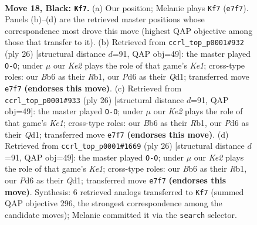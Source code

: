 \documentclass[11pt]{article}
\begin{document}
\clearpage

\begin{figure}[p]\centering
\begin{subfigure}{0.46\textwidth}\centering
\resizebox{\linewidth}{!}{%
\newchessgame
\chessboard[
  setfen={rq6/1bp1k1pp/1b1p1n2/1p2n3/pP2P3/N1P5/P1Q2PPP/1RB1RK2 b - - 3 18},
  showmover=false,
  pgfstyle=straightmove, color=movearrow, markmove={e7-f7}
]}
\caption{}
\end{subfigure}\hfill
\begin{subfigure}{0.46\textwidth}\centering
\resizebox{\linewidth}{!}{%
\newchessgame
\chessboard[
  setfen={r1b2rk1/pp2qppp/2n5/3p4/3P1B2/b2BP3/P2N1PPP/1R1QK2R w K - 1 14},
  showmover=false,
  pgfstyle=straightmove, color=movearrow, markmove={e1-g1}
]}
\caption{}
\end{subfigure}
\\[4pt]
\begin{subfigure}{0.46\textwidth}\centering
\resizebox{\linewidth}{!}{%
\newchessgame
\chessboard[
  setfen={r1b2rk1/pp2qppp/2n5/3p4/3P1B2/b2BP3/P2N1PPP/1R1QK2R w K - 1 14},
  showmover=false,
  pgfstyle=straightmove, color=movearrow, markmove={e1-g1}
]}
\caption{}
\end{subfigure}\hfill
\begin{subfigure}{0.46\textwidth}\centering
\resizebox{\linewidth}{!}{%
\newchessgame
\chessboard[
  setfen={r1b2rk1/pp2qppp/2n5/3p4/3P1B2/b2BP3/P2N1PPP/1R1QK2R w K - 1 14},
  showmover=false,
  pgfstyle=straightmove, color=movearrow, markmove={e1-g1}
]}
\caption{}
\end{subfigure}
\caption{\textbf{Move 18, Black: \texttt{Kf7}.} (a) Our position; Melanie plays \texttt{Kf7} (\texttt{e7f7}). Panels (b)--(d) are the retrieved master positions whose correspondence most drove this move (highest QAP objective among those that transfer to it). (b) Retrieved from \texttt{ccrl\_top\_p0001\#932} (ply 26) [structural distance $d$=91, QAP obj=49]: the master played \texttt{O-O}; under $\mu$ our \emph{Ke2} plays the role of that game's \emph{Ke1}; cross-type roles: our \emph{B}b6 as their \emph{R}b1, our \emph{P}d6 as their \emph{Q}d1; transferred move \texttt{e7f7} \textbf{(endorses this move)}. (c) Retrieved from \texttt{ccrl\_top\_p0001\#933} (ply 26) [structural distance $d$=91, QAP obj=49]: the master played \texttt{O-O}; under $\mu$ our \emph{Ke2} plays the role of that game's \emph{Ke1}; cross-type roles: our \emph{B}b6 as their \emph{R}b1, our \emph{P}d6 as their \emph{Q}d1; transferred move \texttt{e7f7} \textbf{(endorses this move)}. (d) Retrieved from \texttt{ccrl\_top\_p0001\#1669} (ply 26) [structural distance $d$=91, QAP obj=49]: the master played \texttt{O-O}; under $\mu$ our \emph{Ke2} plays the role of that game's \emph{Ke1}; cross-type roles: our \emph{B}b6 as their \emph{R}b1, our \emph{P}d6 as their \emph{Q}d1; transferred move \texttt{e7f7} \textbf{(endorses this move)}. Synthesis: 6 retrieved analogs transferred to \texttt{Kf7} (summed QAP objective 296, the strongest correspondence among the candidate moves); Melanie committed it via the \texttt{search} selector.}
\label{fig:thought-m35}
\end{figure}
\end{document}
